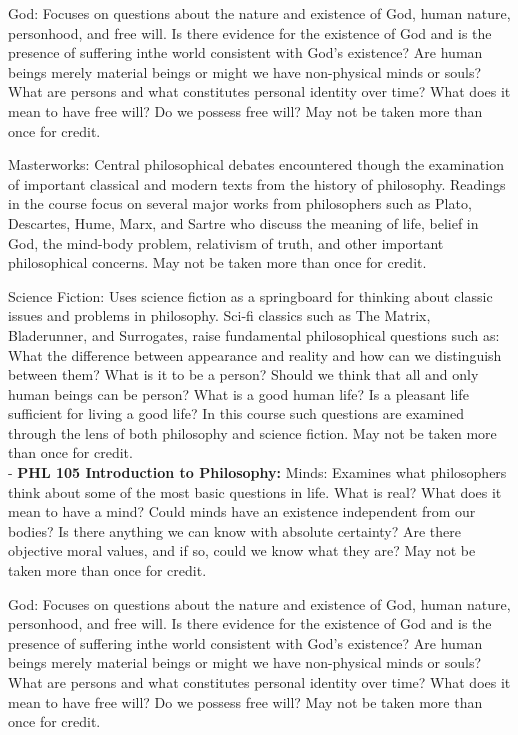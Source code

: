 \documentclass[
  letterpaper,
]{scrbook}
\begin{document}
God: Focuses on questions about the nature and existence of God, human
nature, personhood, and free will. Is there evidence for the existence
of God and is the presence of suffering inthe world consistent with
God's existence? Are human beings merely material beings or might we
have non-physical minds or souls? What are persons and what constitutes
personal identity over time? What does it mean to have free will? Do we
possess free will? May not be taken more than once for credit.

Masterworks: Central philosophical debates encountered though the
examination of important classical and modern texts from the history of
philosophy. Readings in the course focus on several major works from
philosophers such as Plato, Descartes, Hume, Marx, and Sartre who
discuss the meaning of life, belief in God, the mind-body problem,
relativism of truth, and other important philosophical concerns. May not
be taken more than once for credit.

Science Fiction: Uses science fiction as a springboard for thinking
about classic issues and problems in philosophy. Sci-fi classics such as
The Matrix, Bladerunner, and Surrogates, raise fundamental philosophical
questions such as: What the difference between appearance and reality
and how can we distinguish between them? What is it to be a person?
Should we think that all and only human beings can be person? What is a
good human life? Is a pleasant life sufficient for living a good life?
In this course such questions are examined through the lens of both
philosophy and science fiction. May not be taken more than once for
credit.\\
- \textbf{PHL 105 Introduction to Philosophy:} Minds: Examines what
philosophers think about some of the most basic questions in life. What
is real? What does it mean to have a mind? Could minds have an existence
independent from our bodies? Is there anything we can know with absolute
certainty? Are there objective moral values, and if so, could we know
what they are? May not be taken more than once for credit.

God: Focuses on questions about the nature and existence of God, human
nature, personhood, and free will. Is there evidence for the existence
of God and is the presence of suffering inthe world consistent with
God's existence? Are human beings merely material beings or might we
have non-physical minds or souls? What are persons and what constitutes
personal identity over time? What does it mean to have free will? Do we
possess free will? May not be taken more than once for credit.
\end{document}
